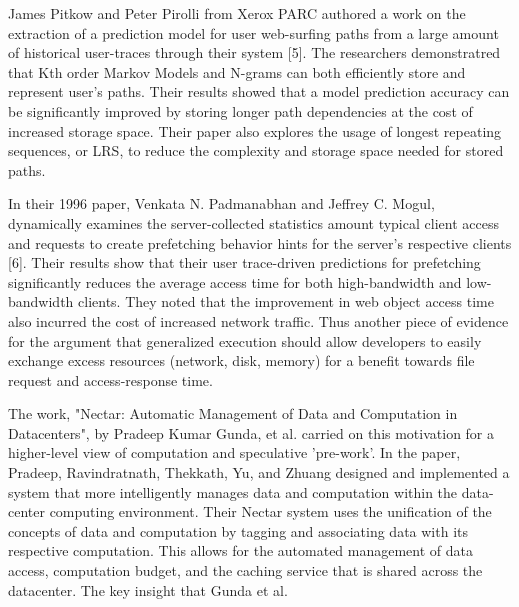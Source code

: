 James Pitkow and Peter Pirolli from Xerox PARC authored a work  on the extraction of a prediction model for user web-surfing paths from a large amount of historical user-traces through their system [5]. The researchers demonstratred that Kth order Markov Models and N-grams can both efficiently store and represent user's paths. Their results showed that a model prediction accuracy can be significantly improved by storing longer path dependencies at the cost of increased storage space. Their paper also explores the usage of longest repeating sequences, or LRS, to reduce the complexity and storage space needed for stored paths.

In their 1996 paper, Venkata N. Padmanabhan and Jeffrey C. Mogul, dynamically examines the server-collected statistics amount typical client access and requests to create prefetching behavior hints for the server's respective clients [6]. Their results show that their user trace-driven predictions for prefetching significantly reduces the average access time for both high-bandwidth and low-bandwidth clients. They noted that the improvement in web object access time also incurred the cost of increased network traffic. Thus another piece of evidence for the argument that generalized execution should allow developers to easily exchange excess resources (network, disk, memory) for a benefit towards file request and access-response time.

The work, "Nectar: Automatic Management of Data and Computation in Datacenters", by Pradeep Kumar Gunda, et al. carried on this motivation for a higher-level view of computation and speculative 'pre-work'. In the paper, Pradeep, Ravindratnath, Thekkath, Yu, and Zhuang designed and implemented a system that more intelligently manages data and computation within the data-center computing environment. Their Nectar system uses the unification of the concepts of data and computation by tagging and associating data with its respective computation. This allows for the automated management of data access, computation budget, and the caching service that is shared across the datacenter.  The key insight that Gunda et al. 
